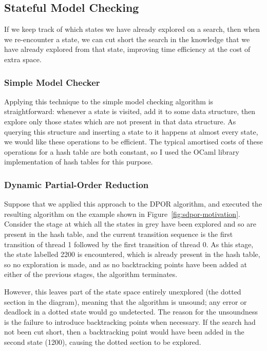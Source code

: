 \documentclass[12pt,a4paper,twoside,openright]{report}
\begin{document}
\subsection{Stateful Model Checking}
If we keep track of which states we have
already explored on a search, then when
we re-encounter a state, we can cut short
the search in the knowledge that we have
already explored from that state, improving
time efficiency at the cost of extra space.

\subsubsection{Simple Model Checker}

Applying this technique to the simple model
checking algorithm is straightforward: whenever
a state is visited, add it to some data structure,
then explore only those states which are not
present in that data structure. As querying
this structure and inserting a state to it
happens at almost every state, we would like these
operations to be efficient. The typical amortised costs
of these operations for a hash table are both
constant, so I used the OCaml library implementation
of hash tables for this purpose.

\subsubsection{Dynamic Partial-Order Reduction}
Suppose that we applied this approach
to the DPOR algorithm,
and executed the resulting algorithm
on the example shown in
Figure~\ref{fig:sdpor-motivation}.
Consider the stage at which
all the states in grey have been
explored and so are present in the hash table,
and the current transition sequence is the first
transition of thread 1 followed by the first
transition of thread 0. As this stage, the state
labelled 2200 is encountered, which is already
present in the hash table, so no exploration is
made, and as no backtracking points have been added
at either of the previous stages, the algorithm
terminates.

However, this leaves part of the state
space entirely unexplored (the dotted section in
the diagram), meaning that the algorithm is unsound;
any error or deadlock in a dotted state would go
undetected.
The reason for the unsoundness is the failure to
introduce backtracking points when necessary. If the
search had not been cut short, then a backtracking point
would have been added in the second state (1200), causing the
dotted section to be explored.
\end{document}
